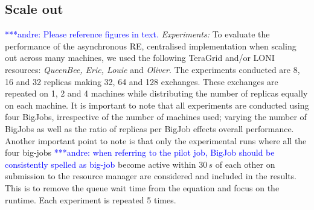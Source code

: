 \documentclass{rspublic}
\newcommand{\alnote}[1]{ {\textcolor{blue} { ***andre: #1 }}}
\newcommand{\alnote}[1]{}
\begin{document}
\subsection{Scale out}
\alnote{Please reference figures in text.}
{\it Experiments:} To evaluate the performance of the asynchronous RE, centralised implementation
when scaling out across many machines, we
used the following TeraGrid and/or LONI resources: \emph{QueenBee,
  Eric, Louie} and \emph{Oliver}. The experiments conducted are 8, 16
and 32 replicas making 32, 64 and 128 exchanges. These exchanges are
repeated on 1, 2 and 4 machines while distributing the number of
replicas equally on each machine. It is important to note that all
experiments are conducted using four BigJobs, irrespective of the
number of machines used; varying the number of BigJobs as well as the
ratio of replicas per BigJob effects overall performance.  Another
important point to note is that only the experimental runs where all
the four big-jobs \alnote{when referring to the pilot job, BigJob should be consistently
spelled as big-job} become active within $30\,s$ of each other on
submission to the resource manager are considered and included in the
results. This is to remove the queue wait time from the equation and
focus on the runtime. Each experiment is repeated 5 times.

%
\end{document}
